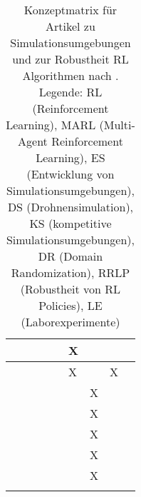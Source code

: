 \begin{longtable}{|l|llllllll|}
    \cite[]{Pan.2021}             & \multicolumn{1}{l|}{}   & \multicolumn{1}{l|}{}    & \multicolumn{1}{l|}{}   & \multicolumn{1}{l|}{}   & \multicolumn{1}{l|}{X}   & \multicolumn{1}{l|}{}   & \multicolumn{1}{l|}{}     &    \\ \hline
    \cite[]{Zhai.2022}            & \multicolumn{1}{l|}{}   & \multicolumn{1}{l|}{}    & \multicolumn{1}{l|}{}   & \multicolumn{1}{l|}{}   & \multicolumn{1}{l|}{X}   & \multicolumn{1}{l|}{}   & \multicolumn{1}{l|}{X}     &   \\ \hline
    \cite[]{Tobin.2017}           & \multicolumn{1}{l|}{}   & \multicolumn{1}{l|}{}    & \multicolumn{1}{l|}{}   & \multicolumn{1}{l|}{}   & \multicolumn{1}{l|}{}   & \multicolumn{1}{l|}{X}   & \multicolumn{1}{l|}{}     &   \\ \hline
    \cite[]{Chen.2021}            & \multicolumn{1}{l|}{}   & \multicolumn{1}{l|}{}    & \multicolumn{1}{l|}{}   & \multicolumn{1}{l|}{}   & \multicolumn{1}{l|}{}   & \multicolumn{1}{l|}{X}   & \multicolumn{1}{l|}{}     &   \\ \hline
    \cite[]{Hsu.2023}             & \multicolumn{1}{l|}{}   & \multicolumn{1}{l|}{}    & \multicolumn{1}{l|}{}   & \multicolumn{1}{l|}{}   & \multicolumn{1}{l|}{}   & \multicolumn{1}{l|}{X}   & \multicolumn{1}{l|}{}     &   \\ \hline
    \cite[]{Alghonaim.5302021652021}& \multicolumn{1}{l|}{}   & \multicolumn{1}{l|}{}    & \multicolumn{1}{l|}{}   & \multicolumn{1}{l|}{}   & \multicolumn{1}{l|}{}   & \multicolumn{1}{l|}{X}   & \multicolumn{1}{l|}{}     &   \\ \hline
    \cite[]{Sadeghi.2016}         & \multicolumn{1}{l|}{}   & \multicolumn{1}{l|}{}    & \multicolumn{1}{l|}{}   & \multicolumn{1}{l|}{}   & \multicolumn{1}{l|}{}   & \multicolumn{1}{l|}{X}   & \multicolumn{1}{l|}{}     &   \\ \hline
    \caption{Konzeptmatrix für Artikel zu Simulationsumgebungen und zur Robustheit RL Algorithmen nach \cite[]{10.5555/2017160.2017162}.
    Legende: RL (Reinforcement Learning), MARL (Multi-Agent Reinforcement Learning), ES (Entwicklung von Simulationsumgebungen), DS (Drohnensimulation), KS (kompetitive Simulationsumgebungen), DR (Domain Randomization), RRLP (Robustheit von RL Policies), LE (Laborexperimente)}
    \label{tab:research-table}\\
\end{longtable}